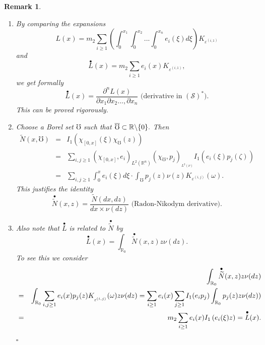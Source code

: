 \documentclass[12pt]{article}%
\newtheorem{remark}[theorem]{Remark}
\newcommand{\dproof}{\noindent {Proof.} \quad}
\newcommand{\fproof}{\hfill $\square$ \bigskip}
\numberwithin{equation}{section}
\def\realio{\mathbb{R}_{0}}
\begin{document}
\begin{remark}
\begin{enumerate}
\item[(i)]
By comparing the expansions%
\[
L(x)=m_2 \sum_{i\geq 1}\left( \int_{0}^{x_1}\int_0^{x_2} ... \int_0^{x_n} e _{i}(\xi) d\xi\right)
K_{\varepsilon ^{(i,1)}}
\]%
and%
\[
\overset{\bullet }{L}(x)=m_{2}\sum_{i\geq 1}e _{i}(x)K_{\varepsilon
^{(i,1)}},
\]%
we get formally
\begin{equation}
\overset{\bullet }{L}(x)=\frac{\partial^n L(x)}{\partial x_1 \partial x_2 ..., \partial x_n}\text{ (derivative in }(%
\mathcal{S})^{* }). 
\end{equation}
This can be proved rigorously.
\item[(ii)] 
Choose a Borel set $\mho $ such that $\overline{\mho }\subset \mathbb{%
R}\backslash \{0\}.$ Then%
\begin{eqnarray*}
\widetilde{N}(x,\mho ) &=&I_{1}\left( \chi _{[0,x]}(\xi)\chi _{\mho
}(z)\right)  \\
&=&\sum_{i,j\geq 1}(\chi _{[0,x]},e _{i})_{L^{2}(\mathbb{R}^n)}(\chi
_{\mho },p_{j})_{_{L^{2}(\nu )}}I_{1}\left( e _{i}(\xi)p_{j}(\zeta)\right) \\
&=&\sum_{i,j\geq 1}\int_{0}^{x}e _{i}(\xi)d\xi\cdot \int_{\mho }p_{j}(z)\nu
(z)K_{\varepsilon ^{(i,j)}}(\omega ).
\end{eqnarray*}%
This justifies the identity
\begin{equation}
\overset{\bullet }{\widetilde{N}}(x,z)=\frac{\widetilde{N}(dx,dz)}{dx\times
\nu (dz)}\text{ (Radon-Nikodym derivative).}  \label{10.26}
\end{equation}%
\item[(iii)]
Also note that $\overset{\bullet }{L}$ is related to $%
\overset{\bullet }{\widetilde{N}}$ by%
\begin{equation}
\overset{\bullet }{L}(x)=\int_{\realio} \overset{\bullet }{\widetilde{N%
}}(x,z)z\nu (dz).  
\end{equation}%
\dproof
To see this we consider%
\begin{eqnarray*}
&&\int_{\realio}\overset{\bullet }{\widetilde{N}}(x,z)z\nu (dz) \\
&=&\int_{\realio}\sum_{i,j\geq 1}e _{i}(x)p_{j}(z)K_{_{\varepsilon
^{(i,j)}}}(\omega )z\nu (dz)
=\sum_{i\geq 1}e _{i}(x)\sum_{j\geq 1}I_{1}( e
_{i}p_j)\int_{\realio} p_{j}(z)z\nu (dz))  \\
&=&m_2\sum_{i\geq 1}e _{i}(x)I_{1}\left( e _{i}(\xi)z\right) =\overset{%
\bullet }{L}(x).
\end{eqnarray*}
\fproof
\end{enumerate}
\end{remark}
\end{document}
